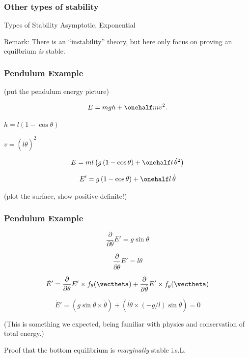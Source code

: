 \documentclass[12pt]{beamer}
\begin{document}
\begin{frame}
\frametitle{Other types of stability}

\begin{block}{Types of Stability}
Asymptotic,
Exponential
\end{block}

Remark: There is an ``instability'' theory, but here only focus on proving an equilbrium \emph{is} stable.


\end{frame}




\begin{frame}
\frametitle{Pendulum Example}

(put the pendulum energy picture)

\[
E = mgh + \onehalf m v^2.
\]

$h = l(1-\cos\theta)$

$v = (l\dot\theta)^2$

\[
E
	= ml \left( g \, (1-\cos\theta) + \onehalf l \, \dot\theta^2 \right)
\]

\[
E' = g \, (1-\cos\theta) + \onehalf l \, \dot\theta
\]

(plot the surface, show positive definite!)

\end{frame}



\begin{frame}
\frametitle{Pendulum Example}
\[
\frac{\partial}{\partial\theta} E' = g \sin \theta
\]

\[
\frac{\partial}{\partial\dot\theta} E' = l \dot\theta
\]

\[
\dot E' =
	\frac{\partial}{\partial\theta} E' 
		\times f_{\theta}(\vectheta)
	+ \frac{\partial}{\partial\dot\theta} E'
		\times f_{\dot\theta}(\vectheta)
\]


\[
\dot E' =
	\left( g \sin\theta \times \dot\theta \right)
	+ \left( l \dot\theta \times (-g/l) \sin \theta \right) = 0
\]

(This is something we expected, being familiar with physics and conservation of total energy.)

Proof that the bottom equilibrium is \emph{marginally} stable i.s.L.

\end{frame}
\end{document}
